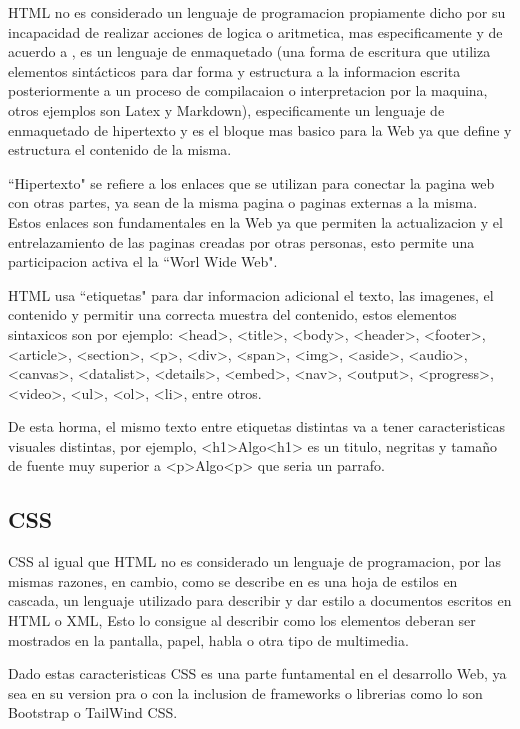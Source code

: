 HTML no es considerado un lenguaje de programacion propiamente dicho por su
incapacidad de realizar acciones de logica o aritmetica, mas especificamente y
de acuerdo a \cite{HTML},
es un lenguaje de enmaquetado (una forma de escritura que utiliza elementos
sintácticos para dar forma y estructura a la informacion escrita posteriormente
a un proceso de  compilacaion o interpretacion por la maquina, otros ejemplos son
Latex y Markdown), especificamente un lenguaje de enmaquetado de hipertexto y es
el bloque mas basico para la Web ya que define y estructura el contenido de la
misma.

``Hipertexto"  se refiere a los enlaces que se utilizan para conectar la pagina
web con otras partes, ya sean de la misma pagina o paginas externas a la misma.
Estos enlaces son fundamentales en la Web ya que permiten la actualizacion y el
entrelazamiento de las paginas creadas por otras personas, esto permite
una participacion activa el la ``Worl Wide Web".

HTML usa ``etiquetas" para dar informacion adicional  el texto, las imagenes,
el contenido y permitir
una correcta muestra del contenido, estos elementos sintaxicos son por ejemplo:
 <head>, <title>, <body>, <header>, <footer>, <article>, <section>, <p>, <div>,
 <span>, <img>, <aside>, <audio>, <canvas>, <datalist>, <details>, <embed>,
 <nav>, <output>, <progress>, <video>, <ul>, <ol>, <li>, entre otros.

 De esta horma, el mismo texto entre etiquetas distintas va a tener caracteristicas
 visuales distintas, por ejemplo, <h1>Algo<h1> es un titulo, negritas y tamaño de
 fuente muy superior a <p>Algo<p> que seria un parrafo.


\subsection{CSS}

CSS al igual que HTML no es considerado un lenguaje de programacion, por las mismas
razones, en cambio, como se describe en \cite{CSS} es una hoja de estilos en cascada,
un lenguaje utilizado para describir y dar estilo a documentos escritos en HTML o
XML, Esto lo consigue al describir como los elementos deberan ser mostrados en la
pantalla, papel, habla o otra tipo de multimedia.

Dado estas caracteristicas CSS es una parte funtamental en el desarrollo Web, ya
sea en su version pra o con la inclusion de frameworks o librerias como lo son
Bootstrap o TailWind CSS.

